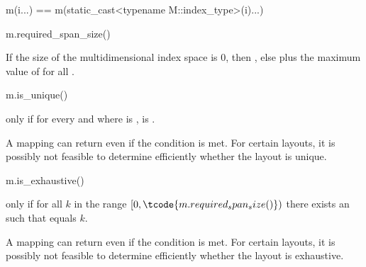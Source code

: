 \begin{itemdecl}
m(i...) == m(static_cast<typename M::index_type>(i)...)
\end{itemdecl}

\begin{itemdescr}
\pnum
\result
{}

\pnum
\returns
{}
\end{itemdescr}

\begin{itemdecl}
m.required_span_size()
\end{itemdecl}

\begin{itemdescr}
\pnum
\result
{}

\pnum
\returns
If the size of the multidimensional index space  is 0,
then ,
else  plus the maximum value of  for all .
\end{itemdescr}

\begin{itemdecl}
m.is_unique()
\end{itemdecl}

\begin{itemdescr}
\pnum
\result
{}

\pnum
\returns
{} only if
for every  and  where  is ,
 is .
\begin{note}
A mapping can return  even if the condition is met.
For certain layouts, it is possibly not feasible to determine efficiently
whether the layout is unique.
\end{note}
\end{itemdescr}

\begin{itemdecl}
m.is_exhaustive()
\end{itemdecl}

\begin{itemdescr}
\pnum
\result
{}

\pnum
\returns
{} only if
for all $k$ in the range $[0, \tcode{m.required_span_size()})$
there exists an  such that  equals $k$.
\begin{note}
A mapping can return  even if the condition is met.
For certain layouts, it is possibly not feasible to determine efficiently
whether the layout is exhaustive.
\end{note}
\end{itemdescr}

